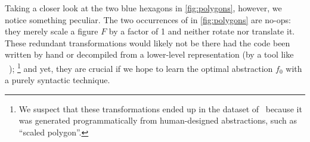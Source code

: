 


Taking a closer look at
  the two blue hexagons in \autoref{fig:polygons},
  however, we notice something peculiar.
The two occurrences of 
  in \autoref{fig:polygons} are no-ops:
  they merely scale a figure $F$ by a factor of 1
  and neither rotate nor translate it.
%
These redundant transformations would likely not be there
had the code been written by hand 
or decompiled from a lower-level representation (by a tool like ~\cite{szalinski});%
  \footnote{
    We suspect that these transformations
    ended up in the dataset of~\citet{cogsci-dataset}
    because it was generated programmatically from
    human-designed abstractions, such as ``scaled polygon''.}
and yet, they are crucial
  if we hope to learn the optimal abstraction $f_0$
  with a purely syntactic technique.

